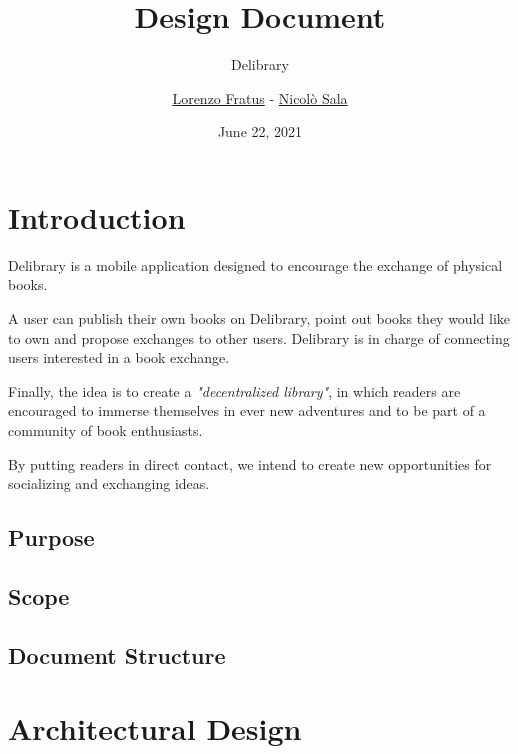 
\graphicspath{ {assets/} }

\title{Design Document}
\subtitle{Delibrary}
\author{\href{https://github.com/lorenzofratus}{Lorenzo Fratus} - \href{https://github.com/nicheosala}{Nicolò Sala}}
\date{June 22, 2021}



\maketitle

\tableofcontents



\chapter{Introduction}

Delibrary is a mobile application designed to encourage the exchange of physical books.

A user can publish their own books on Delibrary, point out books they would like to own and propose exchanges to other users.
Delibrary is in charge of connecting users interested in a book exchange.

Finally, the idea is to create a \emph{"decentralized library"}, in which readers are encouraged to immerse themselves
in ever new adventures and to be part of a community of book enthusiasts.

By putting readers in direct contact, we intend to create new opportunities for socializing and exchanging ideas.

\section{Purpose}

\section{Scope}

\section{Document Structure}



\chapter{Architectural Design}

